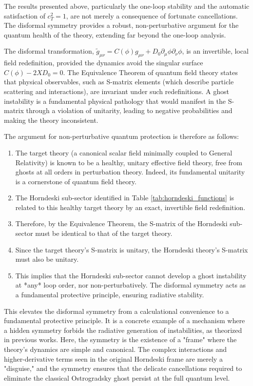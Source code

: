 \documentclass[twocolumn]{aastex631}
\begin{document}
The results presented above, particularly the one-loop stability and the automatic satisfaction of $c_T^2=1$, are not merely a consequence of fortunate cancellations. The disformal symmetry provides a robust, non-perturbative argument for the quantum health of the theory, extending far beyond the one-loop analysis.

The disformal transformation, $\tilde{g}_{\mu\nu} = C(\phi) g_{\mu\nu} + D_0 \partial_\mu\phi \partial_\nu\phi$, is an invertible, local field redefinition, provided the dynamics avoid the singular surface $C(\phi) - 2XD_0 = 0$. The Equivalence Theorem of quantum field theory states that physical observables, such as S-matrix elements (which describe particle scattering and interactions), are invariant under such redefinitions. A ghost instability is a fundamental physical pathology that would manifest in the S-matrix through a violation of unitarity, leading to negative probabilities and making the theory inconsistent.

The argument for non-perturbative quantum protection is therefore as follows:
\begin{enumerate}
    \item The target theory (a canonical scalar field minimally coupled to General Relativity) is known to be a healthy, unitary effective field theory, free from ghosts at all orders in perturbation theory. Indeed, its fundamental unitarity is a cornerstone of quantum field theory.
    \item The Horndeski sub-sector identified in Table \ref{tab:horndeski_functions} is related to this healthy target theory by an exact, invertible field redefinition.
    \item Therefore, by the Equivalence Theorem, the S-matrix of the Horndeski sub-sector must be identical to that of the target theory.
    \item Since the target theory's S-matrix is unitary, the Horndeski theory's S-matrix must also be unitary.
    \item This implies that the Horndeski sub-sector cannot develop a ghost instability at *any* loop order, nor non-perturbatively. The disformal symmetry acts as a fundamental protective principle, ensuring radiative stability.
\end{enumerate}
This elevates the disformal symmetry from a calculational convenience to a fundamental protective principle. It is a concrete example of a mechanism where a hidden symmetry forbids the radiative generation of instabilities, as theorized in previous works. Here, the symmetry is the existence of a "frame" where the theory's dynamics are simple and canonical. The complex interactions and higher-derivative terms seen in the original Horndeski frame are merely a "disguise," and the symmetry ensures that the delicate cancellations required to eliminate the classical Ostrogradsky ghost persist at the full quantum level.
\end{document}
